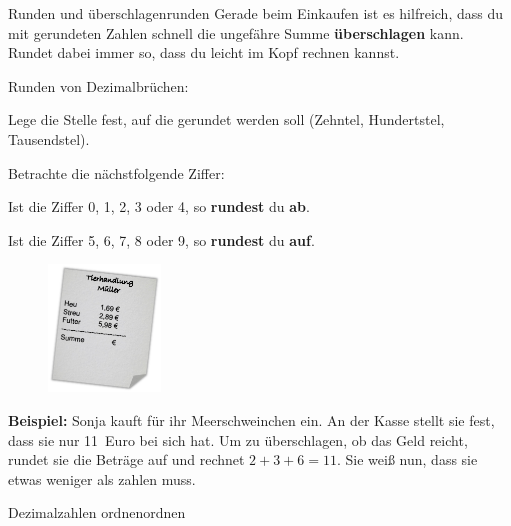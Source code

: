 \documentclass[12pt,a5paper,landscape]{scrartcl}
\begin{document}
	\begin{hilfekarte}{Runden und überschlagen}{runden}
		Gerade beim Einkaufen ist es hilfreich, dass du mit gerundeten Zahlen schnell die ungefähre Summe \textbf{überschlagen} kann. Rundet dabei immer so, dass du leicht im Kopf rechnen kannst.
		
		Runden von Dezimalbrüchen:
		\begin{smallenumerate}
			\item Lege die Stelle fest, auf die gerundet werden soll (Zehntel, Hundertstel, Tausendstel).
			\item Betrachte die nächstfolgende Ziffer:
			\begin{smallitemize}
				\item Ist die Ziffer 0, 1, 2, 3 oder 4, so \textbf{rundest} du \textbf{ab}.
				\item Ist die Ziffer 5, 6, 7, 8 oder 9, so \textbf{rundest} du \textbf{auf}.
			\end{smallitemize}
		\end{smallenumerate}
		
		\begin{wrapfig}
			\begin{figure}		
				\includegraphics[width=3cm]{6.2-LT-Abb_Kassenzettel_0}
			\end{figure}
			\textbf{Beispiel:} Sonja kauft für ihr Meerschweinchen ein. An der Kasse stellt sie fest, dass sie nur \SI{11}{ Euro} bei sich hat. Um zu überschlagen, ob das Geld reicht, rundet sie die Beträge auf und rechnet $2+3+6=11$. Sie weiß nun, dass sie etwas weniger als  zahlen muss.
		\end{wrapfig}
	\end{hilfekarte}
	
	\begin{hilfekarte}{Dezimalzahlen ordnen}{ordnen}

	\end{hilfekarte}
	
\end{document}

